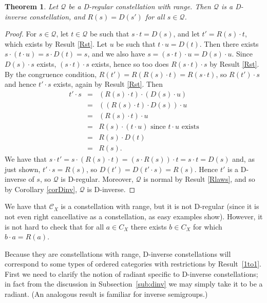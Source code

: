 \documentclass[12pt]{amsart}
\newtheorem{thm}{Theorem}[section]
\theoremstyle{definition}
\newcommand{\bea}{\begin{eqnarray*}}
\newcommand{\eea}{\end{eqnarray*}}
\newcommand{\Q}{\mathcal Q}
\newcommand{\C}{\mathcal C}
\begin{document}
\begin{thm}  \label{main}
Let $\Q$ be a D-regular constellation with range.  Then $\Q$ is a D-inverse constellation, and $R(s)=D(s')$  for all $s\in \Q$.
\end{thm}
\begin{proof}
For $s\in \Q$, let $t\in \Q$ be such that $s\cdot t=D(s)$, and let $t'=R(s)\cdot t$, which exists by Result \ref{Rst}.  Let $u$ be such that $t\cdot u=D(t)$.  Then there exists $s\cdot(t\cdot u)=s\cdot D(t)=s$, and we also have $s=(s\cdot t)\cdot u=D(s)\cdot u$.  Since $D(s)\cdot s$ exists, $(s\cdot t)\cdot s$ exists, hence so too does $R(s\cdot t)\cdot s$ by Result \ref{Rst}. By the congruence condition, $R(t')=R(R(s)\cdot t)=R(s\cdot t)$, so $R(t')\cdot s$ and hence $t'\cdot s$ exists, again by Result \ref{Rst}.  
Then
\bea
t'\cdot s&=&(R(s)\cdot t)\cdot (D(s)\cdot u)\\
&=&((R(s)\cdot t)\cdot D(s))\cdot u\\
&=&(R(s)\cdot t)\cdot u\\
&=&R(s)\cdot (t\cdot u)\mbox{ since $t\cdot u$ exists}\\
&=&R(s)\cdot D(t)\\
&=&R(s).
\eea
We have that $s\cdot t'=s\cdot(R(s)\cdot t)=(s\cdot R(s))\cdot t=s\cdot t=D(s)$ and, as just shown, $t'\cdot s=R(s)$, so $D(t')=D(t'\cdot s)=R(s)$.  Hence $t'$ is a D-inverse of $s$, so $\Q$ is D-regular.  Moreover, $\Q$ is normal by Result \ref{Rlaws}, and so by Corollary \ref{corDinv}, $\Q$ is D-inverse.
\end{proof} 

We have that $\C_X$ is a constellation with range, but it is not D-regular (since it is not even right cancellative as a constellation, as easy examples show).  However, it is not hard to check that for all $a\in C_X$ there exists $b\in C_X$ for which $b\cdot a=R(a)$.  

Because they are constellations with range, D-inverse constellations will correspond to some types of ordered categories with restrictions by Result~\ref{1to1}. First we need to clarify the notion of radiant specific to D-inverse constellations; in fact from the discussion in Subsection~\ref{sub:dinv} we may simply take it to be a  radiant. (An analogous result is familiar for inverse semigroups.)
\end{document}
